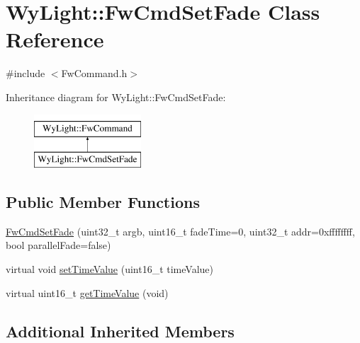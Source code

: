 \hypertarget{class_wy_light_1_1_fw_cmd_set_fade}{\section{Wy\-Light\-:\-:Fw\-Cmd\-Set\-Fade Class Reference}
\label{class_wy_light_1_1_fw_cmd_set_fade}
}


{\ttfamily \#include $<$Fw\-Command.\-h$>$}

Inheritance diagram for Wy\-Light\-:\-:Fw\-Cmd\-Set\-Fade\-:\begin{figure}[H]
\begin{center}
\leavevmode
\includegraphics[height=2.000000cm]{class_wy_light_1_1_fw_cmd_set_fade}
\end{center}
\end{figure}
\subsection*{Public Member Functions}
\begin{DoxyCompactItemize}
\item 
\hyperlink{class_wy_light_1_1_fw_cmd_set_fade_a805da076fa5c6d2aaaf31a6b9ac61f62}{Fw\-Cmd\-Set\-Fade} (uint32\-\_\-t argb, uint16\-\_\-t fade\-Time=0, uint32\-\_\-t addr=0xffffffff, bool parallel\-Fade=false)
\item 
virtual void \hyperlink{class_wy_light_1_1_fw_cmd_set_fade_a8ab530cadbd62f8d1fc6eb611e7835fa}{set\-Time\-Value} (uint16\-\_\-t time\-Value)
\item 
virtual uint16\-\_\-t \hyperlink{class_wy_light_1_1_fw_cmd_set_fade_af6c336ecb245996d538ec44bf65b8a49}{get\-Time\-Value} (void)
\end{DoxyCompactItemize}
\subsection*{Additional Inherited Members}


